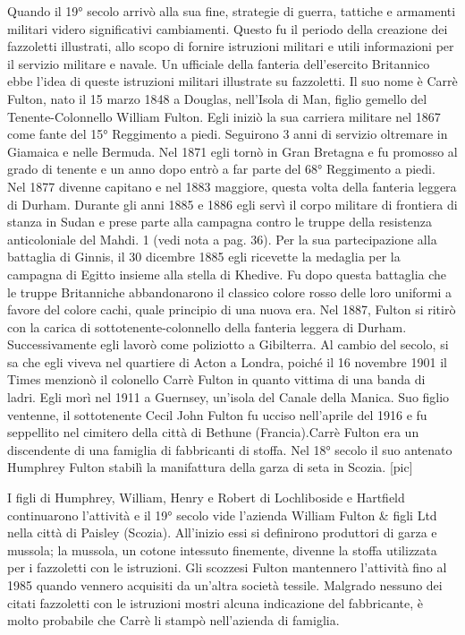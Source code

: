 Quando il 19° secolo arrivò alla sua fine, strategie di guerra, tattiche
e armamenti militari videro significativi cambiamenti. Questo fu il
periodo della creazione dei fazzoletti illustrati, allo scopo di fornire
istruzioni militari e utili informazioni per il servizio militare e
navale. Un ufficiale della fanteria dell'esercito Britannico ebbe l'idea
di queste istruzioni militari illustrate su fazzoletti. Il suo nome è
Carrè Fulton, nato il 15 marzo 1848 a Douglas, nell'Isola di Man, figlio
gemello del Tenente-Colonnello William Fulton. Egli iniziò la sua
carriera militare nel 1867 come fante del 15° Reggimento a piedi.
Seguirono 3 anni di servizio oltremare in Giamaica e nelle Bermuda. Nel
1871 egli tornò in Gran Bretagna e fu promosso al grado di tenente e un
anno dopo entrò a far parte del 68° Reggimento a piedi. Nel 1877 divenne
capitano e nel 1883 maggiore, questa volta della fanteria leggera di
Durham. Durante gli anni 1885 e 1886 egli servì il corpo militare di
frontiera di stanza in Sudan e prese parte alla campagna contro le
truppe della resistenza anticoloniale del Mahdi. 1 (vedi nota a pag.
36). Per la sua partecipazione alla battaglia di Ginnis, il 30 dicembre
1885 egli ricevette la medaglia per la campagna di Egitto insieme alla
stella di Khedive. Fu dopo questa battaglia che le truppe Britanniche
abbandonarono il classico colore rosso delle loro uniformi a favore del
colore cachi, quale principio di una nuova era. Nel 1887, Fulton si
ritirò con la carica di sottotenente-colonnello della fanteria leggera
di Durham. Successivamente egli lavorò come poliziotto a Gibilterra. Al
cambio del secolo, si sa che egli viveva nel quartiere di Acton a
Londra, poiché il 16 novembre 1901 il Times menzionò il colonello Carrè
Fulton in quanto vittima di una banda di ladri. Egli morì nel 1911 a
Guernsey, un'isola del Canale della Manica. Suo figlio ventenne, il
sottotenente Cecil John Fulton fu ucciso nell'aprile del 1916 e fu
seppellito nel cimitero della città di Bethune (Francia).Carrè Fulton
era un discendente di una famiglia di fabbricanti di stoffa. Nel 18°
secolo il suo antenato Humphrey Fulton stabilì la manifattura della
garza di seta in Scozia. {[}pic{]}

I figli di Humphrey, William, Henry e Robert di Lochliboside e Hartfield
continuarono l'attività e il 19° secolo vide l'azienda William Fulton \&
figli Ltd nella città di Paisley (Scozia). All'inizio essi si definirono
produttori di garza e mussola; la mussola, un cotone intessuto
finemente, divenne la stoffa utilizzata per i fazzoletti con le
istruzioni. Gli scozzesi Fulton mantennero l'attività fino al 1985
quando vennero acquisiti da un'altra società tessile. Malgrado nessuno
dei citati fazzoletti con le istruzioni mostri alcuna indicazione del
fabbricante, è molto probabile che Carrè li stampò nell'azienda di
famiglia.

